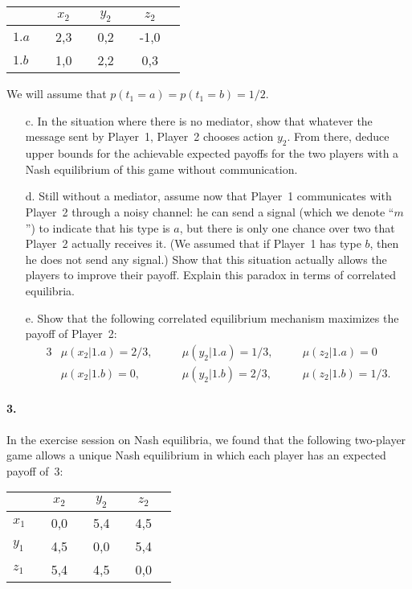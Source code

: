 \documentclass[a4paper,notitlepage,12pt]{article}
\begin{document}
\begin{center}
	\begin{tabular}[h!]{l|ccccccc}
		&& $x_2$ && $y_2$ && $z_2$ & \\
		\hline
		$1.a$ && 2,3 && 0,2 && -1,0 & \\
		$1.b$ && 1,0 && 2,2 && 0,3 & 
	\end{tabular} 
\end{center}
	
We will assume that $p(t_1 = a) = p(t_1 = b) = 1/2$.
	
\begin{enumerate}
	\item[c.] In the situation where there is no mediator, show that whatever the message sent by Player~1, Player~2 chooses action $y_2$. From there, deduce upper bounds for the achievable expected payoffs for the two players with a Nash equilibrium of this game without communication.
	\item[d.] Still without a mediator, assume now that Player~1 communicates with Player~2 through a noisy channel: he can send a signal (which we denote ``$m$'') to indicate that his type is $a$, but there is only one chance over two that Player~2 actually receives it. (We assumed that if Player~1 has type $b$, then he does not send any signal.) Show that this situation actually allows the players to improve their payoff. Explain this paradox in terms of correlated equilibria. 
	\item[e.] Show that the following correlated equilibrium mechanism maximizes the payoff of Player~2:
		\begin{alignat*}{3}
			& \mu(x_2 | 1.a) = 2/3, \quad && \mu(y_2 | 1.a) = 1/3, \quad && \mu(z_2 | 1.a) = 0 \\
			& \mu(x_2 | 1.b) = 0,   \quad && \mu(y_2 | 1.b) = 2/3, \quad && \mu(z_2 | 1.b) = 1/3.
		\end{alignat*}
\end{enumerate}

\paragraph{3. } In the exercise session on Nash equilibria, we found that the following two-player game allows a unique Nash equilibrium in which each player has an expected payoff of~3:

	\begin{center}
		\begin{tabular}[h!]{l|ccccccc}
			&& $x_2$ && $y_2$ && $z_2$ & \\
			\hline
			$x_1$ && 0,0 && 5,4 && 4,5 & \\
			$y_1$ && 4,5 && 0,0 && 5,4 & \\
			$z_1$ && 5,4 && 4,5 && 0,0 & 
		\end{tabular} 
	\end{center}
	
\end{document}
